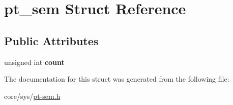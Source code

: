 \hypertarget{structpt__sem}{\section{pt\-\_\-sem Struct Reference}
\label{structpt__sem}
}
\subsection*{Public Attributes}
\begin{DoxyCompactItemize}
\item 
\hypertarget{structpt__sem_a6f341120f42d5fd9f329ff1119594743}{unsigned int {\bfseries count}}\label{structpt__sem_a6f341120f42d5fd9f329ff1119594743}

\end{DoxyCompactItemize}


The documentation for this struct was generated from the following file\-:\begin{DoxyCompactItemize}
\item 
core/sys/\hyperlink{pt-sem_8h}{pt-\/sem.\-h}\end{DoxyCompactItemize}
